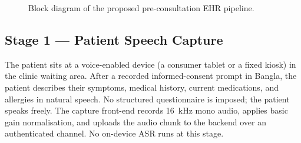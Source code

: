\documentclass[12pt,a4paper]{article}
\begin{document}
\begin{figure}[h!]
\centering
{}
\caption{Block diagram of the proposed pre-consultation EHR pipeline.}
\label{fig:pipeline}
\end{figure}

\subsection{Stage 1 --- Patient Speech Capture}
The patient sits at a voice-enabled device (a consumer tablet or a
fixed kiosk) in the clinic waiting area. After a recorded
informed-consent prompt in Bangla, the patient describes their
symptoms, medical history, current medications, and allergies in
natural speech. No structured questionnaire is imposed; the patient
speaks freely. The capture front-end records 16~kHz mono audio,
applies basic gain normalisation, and uploads the audio chunk to the
backend over an authenticated channel. No on-device ASR runs at this
stage.
\end{document}
